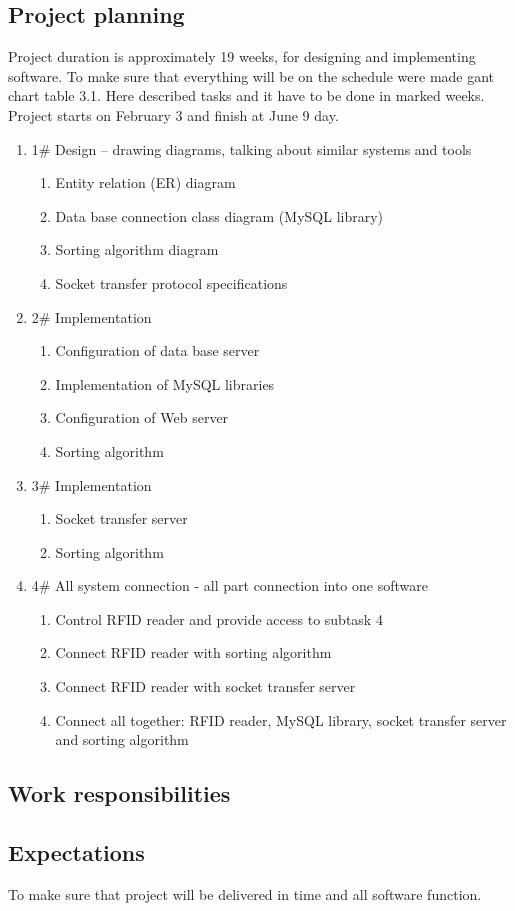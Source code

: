 \subsection{Project planning}

Project duration is approximately 19 weeks, for designing and implementing software. To make sure that everything will be on the schedule were made gant chart table 3.1. Here described tasks and it have to be done in marked weeks. Project starts on February 3 and finish at June 9 day.

\begin{enumerate}
  \item 1\# Design – drawing diagrams, talking about similar systems and tools
  \begin{enumerate}
    \item Entity relation (ER) diagram
    \item Data base connection class diagram (MySQL library)
    \item Sorting algorithm diagram
    \item Socket transfer protocol specifications
  \end{enumerate}
  \item 2\# Implementation
  \begin{enumerate}
    \item Configuration of data base server
    \item Implementation of MySQL libraries
    \item Configuration of Web server
    \item Sorting algorithm
  \end{enumerate} 
  \item 3\# Implementation
  \begin{enumerate}
    \item Socket transfer server
    \item Sorting algorithm
  \end{enumerate}
  \item 4\# All system connection - all part connection into one software
  \begin{enumerate}
    \item Control RFID reader and provide access to subtask 4
    \item Connect RFID reader with sorting algorithm
    \item Connect RFID reader with socket transfer server
    \item Connect all together: RFID reader, MySQL library, socket transfer server and sorting algorithm
  \end{enumerate} 
\end{enumerate}

\subsection{Work responsibilities}

\subsection{Expectations}

To make sure that project will be delivered in time and all software function.

